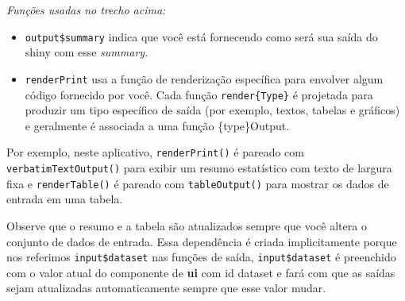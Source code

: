 \documentclass[
]{book}
\newenvironment{Shaded}{\begin{snugshade}}{\end{snugshade}}
\newcommand{\ControlFlowTok}[1]{\textcolor[rgb]{0.13,0.29,0.53}{\textbf{#1}}}
\newcommand{\FunctionTok}[1]{\textcolor[rgb]{0.00,0.00,0.00}{#1}}
\newcommand{\NormalTok}[1]{#1}
\newcommand{\OtherTok}[1]{\textcolor[rgb]{0.56,0.35,0.01}{#1}}
\newcommand{\SpecialCharTok}[1]{\textcolor[rgb]{0.00,0.00,0.00}{#1}}
\newcommand{\StringTok}[1]{\textcolor[rgb]{0.31,0.60,0.02}{#1}}
\begin{document}
\begin{Shaded}
\end{Shaded}

\emph{Funções usadas no trecho acima:}

\begin{itemize}
\item
  \texttt{output\$summary} indica que você está fornecendo como será sua saída do shiny com esse \emph{summary}.
\item
  \texttt{renderPrint} usa a função de renderização específica para envolver algum código fornecido por você. Cada função \texttt{render\{Type\}} é projetada para produzir um tipo específico de saída (por exemplo, textos, tabelas e gráficos) e geralmente é associada a uma função \{type\}Output.
\end{itemize}

Por exemplo, neste aplicativo, \texttt{renderPrint()} é pareado com \texttt{verbatimTextOutput()} para exibir um resumo estatístico com texto de largura fixa e \texttt{renderTable()} é pareado com \texttt{tableOutput()} para mostrar os dados de entrada em uma tabela.

Observe que o resumo e a tabela são atualizados sempre que você altera o conjunto de dados de entrada. Essa dependência é criada implicitamente porque nos referimos \texttt{input\$dataset} nas funções de saída, \texttt{input\$dataset} é preenchido com o valor atual do componente de \textbf{ui} com id dataset e fará com que as saídas sejam atualizadas automaticamente sempre que esse valor mudar.
\end{document}

